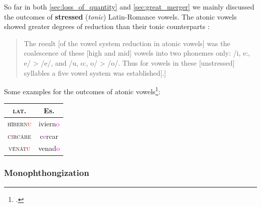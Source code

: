 \documentclass{report}[12pt]
\begin{document}
So far in both \ref{sec:loss_of_quantity} and \ref{sec:great_merger} we mainly discussed the outcomes of \textbf{stressed} (\emph{tonic}) Latin-Romance vowels. The atonic vowels showed greater degrees of reduction than their tonic counterparts \parencite[p.~113]{lloyd_spanish}:
\begin{quote}
  The result [of the vowel system reduction in atonic vowels] was the coalescence of these [high and mid] vowels into two phonemes only: /i, e:, e/ > /e/, and /u, o:, o/ > /o/. Thus for vowels in these [unstressed] syllables a five vowel system was established[.] 
\end{quote}
Some examples for the outcomes of atonic vowels\footcite[p.~113]{lloyd_spanish}:
\begin{center}
  \begin{tabular}{c c}
    \textsc{lat.} & Es. \\
    \hline
    \textsc{h\={i}bern\textcolor{red}{u}} & iviern\textcolor{magenta}{o} \\
    \textsc{c\textcolor{red}{i}rc\={a}re} & c\textcolor{magenta}{e}rcar \\
    \textsc{v\={e}n\={a}t\textcolor{red}{u}} & venad\textcolor{magenta}{o} \\
  \end{tabular}
\end{center}

\subsubsection{Monophthongization}
\end{document}

